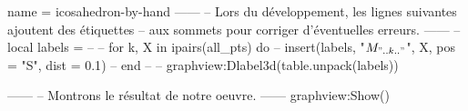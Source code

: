 \documentclass[border = 3pt]{standalone}
\begin{document}
\begin{luadraw*}{name = icosahedron-by-hand}
------
-- Lors du développement, les lignes suivantes ajoutent des étiquettes
-- aux sommets pour corriger d'éventuelles erreurs.
------
-- local labels = {}
--
-- for k, X in ipairs(all_pts) do
--   insert(labels, {"$M_{".. k .."}$", X, {pos = "S", dist = 0.1}})
-- end
--
-- graphview:Dlabel3d(table.unpack(labels))

------
-- Montrons le résultat de notre oeuvre.
------
graphview:Show()
\end{luadraw*}
\end{document}
